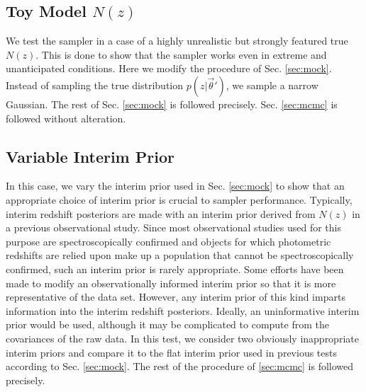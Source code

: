 \documentclass[preprint]{aastex}
\begin{document}
\begin{figure}
\caption{}
\label{fig:multipzs}
\end{figure}


\clearpage
\subsection{Toy Model $N(z)$}
\label{sec:fake}

We test the sampler in a case of a highly unrealistic but strongly featured 
true $N(z)$.  This is done to show that the sampler works even in extreme and 
unanticipated conditions.  Here we modify the procedure of Sec. \ref{sec:mock}. 
 Instead of sampling the true distribution $p(z|\vec{\theta}')$, we sample a 
narrow Gaussian.  The rest of Sec. \ref{sec:mock} is followed precisely.  Sec. 
\ref{sec:mcmc} is followed without alteration.

\begin{figure}
\caption{}
\label{fig:dumbestparam}
\end{figure}

\clearpage
\subsection{Variable Interim Prior}
\label{sec:interim}

In this case, we vary the interim prior used in Sec. \ref{sec:mock} to show 
that an appropriate choice of interim prior is crucial to sampler performance.  
Typically, interim redshift posteriors are made with an interim prior derived 
from $N(z)$ in a previous observational study.  Since most observational 
studies used for this purpose are spectroscopically confirmed and objects for 
which photometric redshifts are relied upon make up a population that cannot be 
spectroscopically confirmed, such an interim prior is rarely appropriate.  Some 
efforts have been made to modify an observationally informed interim prior so 
that it is more representative of the data set.  \citep{Sheldon2012}  However, 
any interim prior of this kind imparts information into the interim redshift 
posteriors.  Ideally, an uninformative interim prior would be used, although it 
may be complicated to compute from the covariances of the raw data.  In this 
test, we consider two obviously inappropriate interim priors and compare it to 
the flat interim prior used in previous tests according to Sec. \ref{sec:mock}. 
 The rest of the procedure of \ref{sec:mcmc} is followed precisely.
\end{document}
